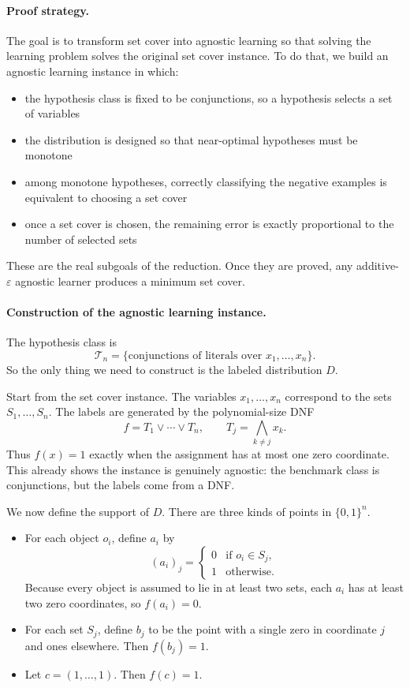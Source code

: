 \paragraph{Proof strategy.}
The goal is to transform set cover into agnostic learning so that solving the learning problem solves the original set cover instance. To do that, we build an agnostic learning instance in which:
\begin{itemize}
\item the hypothesis class is fixed to be conjunctions, so a hypothesis selects a set of variables
\item the distribution is designed so that near-optimal hypotheses must be monotone
\item among monotone hypotheses, correctly classifying the negative examples is equivalent to choosing a set cover
\item once a set cover is chosen, the remaining error is exactly proportional to the number of selected sets
\end{itemize}
These are the real subgoals of the reduction. Once they are proved, any additive-$\varepsilon$ agnostic learner produces a minimum set cover.

\paragraph{Construction of the agnostic learning instance.}
The hypothesis class is
\[
\mathcal{T}_n=\{\text{conjunctions of literals over }x_1,\dots,x_n\}.
\]
So the only thing we need to construct is the labeled distribution $D$.

Start from the set cover instance. The variables $x_1,\dots,x_n$ correspond to the sets $S_1,\dots,S_n$. The labels are generated by the polynomial-size DNF
\[
f = T_1 \vee \cdots \vee T_n,
\qquad
T_j = \bigwedge_{k \ne j} x_k.
\]
Thus $f(x)=1$ exactly when the assignment has at most one zero coordinate. This already shows the instance is genuinely agnostic: the benchmark class is conjunctions, but the labels come from a DNF.

We now define the support of $D$. There are three kinds of points in $\{0,1\}^n$.
\begin{itemize}
\item For each object $o_i$, define $a_i$ by
\[
(a_i)_j =
\begin{cases}
0 & \text{if } o_i \in S_j,\\
1 & \text{otherwise.}
\end{cases}
\]
Because every object is assumed to lie in at least two sets, each $a_i$ has at least two zero coordinates, so $f(a_i)=0$.
\item For each set $S_j$, define $b_j$ to be the point with a single zero in coordinate $j$ and ones elsewhere. Then $f(b_j)=1$.
\item Let $c=(1,\dots,1)$. Then $f(c)=1$.
\end{itemize}

